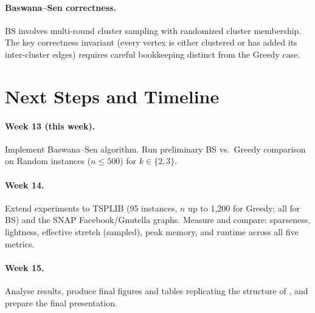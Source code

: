 \documentclass[11pt,letterpaper,twocolumn]{article}
\begin{document}
\paragraph{Baswana--Sen correctness.}
BS involves multi-round cluster sampling with randomized cluster
membership.
The key correctness invariant (every vertex is either clustered
or has added its inter-cluster edges) requires careful bookkeeping
distinct from the Greedy case.

\section{Next Steps and Timeline}

\paragraph{Week 13 (this week).}
Implement Baswana--Sen algorithm.
Run preliminary BS vs.\ Greedy comparison on Random instances
($n \leq 500$) for $k \in \{2,3\}$.

\paragraph{Week 14.}
Extend experiments to TSPLIB (95 instances, $n$ up to 1,200 for
Greedy; all for BS) and the SNAP Facebook/Gnutella graphs.
Measure and compare: sparseness, lightness, effective stretch
(sampled), peak memory, and runtime across all five metrics.

\paragraph{Week 15.}
Analyse results, produce final figures and tables replicating
the structure of \citet{chimani2022spanner}, and prepare the
final presentation.



\end{document}
